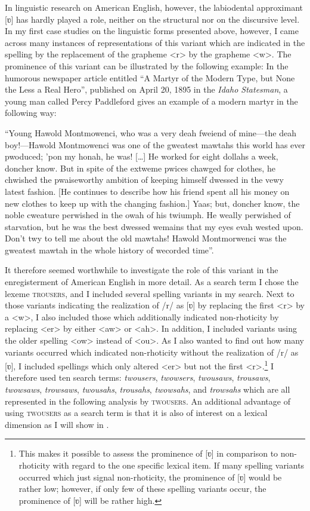 In linguistic research on American English, however, the labiodental approximant [ʋ] has hardly played a role, neither on the structural nor on the discursive level. In my first case studies on the linguistic forms presented above, however, I came across many instances of representations of this variant which are indicated in the spelling by the replacement of the grapheme <r> by the grapheme <w>. The prominence of this variant can be illustrated by the following example: In the humorous newspaper article entitled “A Martyr of the Modern Type, but None the Less a Real Hero”, published on April 20, 1895 in the \emph{Idaho Statesman}, a young man called Percy Paddleford gives an example of a modern martyr in the following way:

\begin{ipquote}
“Young Hawold Montmowenci, who was a very deah fweiend of mine—the deah boy!—Hawold Montmowenci was one of the gweatest mawtahs this world has ever pwoduced; ’pon my honah, he was! […] He worked for eight dollahs a week, doncher know. But in spite of the extweme pwices chawged for clothes, he chwished the pwaiseworthy ambition of keeping himself dwessed in the vewy latest fashion. [He continues to describe how his friend spent all his money on new clothes to keep up with the changing fashion.] Yaas; but, doncher know, the noble cweature perwished in the owah of his twiumph. He weally perwished of starvation, but he was the best dwessed wemains that my eyes evah wested upon. Don’t twy to tell me about the old mawtahs! Hawold Montmorwenci was the gweatest mawtah in the whole history of wecorded time”.
\end{ipquote}


It therefore seemed worthwhile to investigate the role of this variant in the enregisterment of American English in more detail. As a search term I chose the lexeme \textsc{trousers}, and I included several spelling variants in my search. Next to those variants indicating the realization of /r/ as [ʋ] by replacing the first <r> by a <w>, I also included those which additionally indicated non-rhoticity by replacing <er> by either <aw> or <ah>. In addition, I included variants using the older spelling <ow> instead of <ou>. As I also wanted to find out how many variants occurred which indicated non-rhoticity without the realization of /r/ as [ʋ], I included spellings which only altered <er> but not the first <r>.\footnote{This makes it possible to assess the prominence of [ʋ] in comparison to non-rhoticity with regard to the one specific lexical item. If many spelling variants occurred which just signal non-rhoticity, the prominence of [ʋ] would be rather low; however, if only few of these spelling variants occur, the prominence of [ʋ] will be rather high.}  I therefore used ten search terms: \emph{twousers}, \emph{twowsers}, \emph{twousaws}, \emph{trousaws}, \emph{twowsaws}, \emph{trowsaws}, \emph{twousahs}, \emph{trousahs}, \emph{twowsahs}, and \emph{trowsahs} which are all represented in the following analysis by \textsc{twousers}. An additional advantage of using \textsc{twousers} as a search term is that it is also of interest on a lexical dimension as I will show in .


